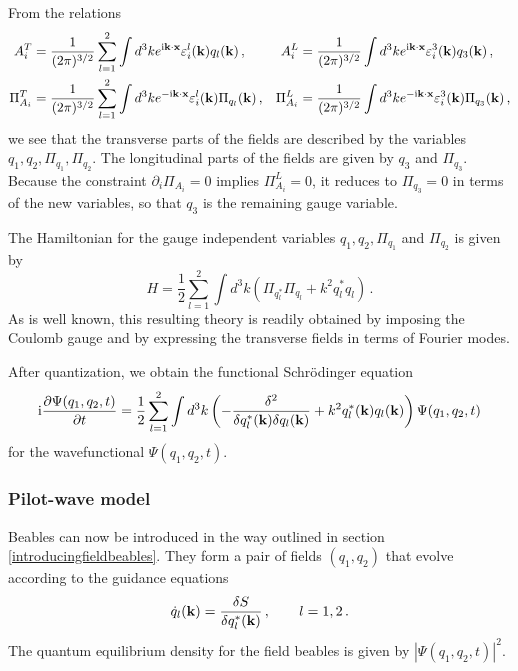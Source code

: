 \documentclass[12pt]{article}
\def\ii{\textrm i}
\begin{document}
From the relations
\begin{align}
A^T_i &= \frac{1}{(2\pi)^{3/2}} \sum^2_{l=1} \int d^3 k e^{\ii {\bf k} \cdot {\bf x}} \varepsilon^l_i({\bf k}) q_l({\bf k}) \,, & A^L_i &=  \frac{1}{(2\pi)^{3/2}} \int d^3 k e^{\ii {\bf k}  \cdot {\bf x}} \varepsilon^3_i({\bf k}) q_3({\bf k}) \,, \nonumber\\
\Pi^T_{A_i} &= \frac{1}{(2\pi)^{3/2}} \sum^2_{l=1} \int d^3 k e^{-\ii {\bf k} \cdot {\bf x}} \varepsilon^l_i({\bf k}) \Pi_{q_l}({\bf k}) \,, & \Pi^L_{A_i} &=  \frac{1}{(2\pi)^{3/2}} \int d^3 k e^{-\ii {\bf k}  \cdot {\bf x}}\varepsilon^3_i({\bf k}) \Pi_{q_3}({\bf k}) \,,
\label{e.12}
\end{align}
we see that the transverse parts of the fields are described by the variables $q_1,q_2,\Pi_{q_1},\Pi_{q_2}$. The longitudinal parts of the fields are given by $q_3$ and $\Pi_{q_3}$. Because the constraint $ \partial_i \Pi_{A_i}=0$ implies $\Pi^L_{A_i}=0$, it reduces to $\Pi_{q_3} =0$ in terms of the new variables, so that $q_3$ is the remaining gauge variable. 

The Hamiltonian for the gauge independent variables $q_1,q_2,\Pi_{q_1}$ and $\Pi_{q_2}$ is given by
\begin{equation}
H =  \frac{1}{2} \sum^2_{l=1} \int d^3 k \left(\Pi_{q^*_l}\Pi_{q_l} +  k^2 q^*_l q_l \right) \,.
\label{e.12.1}
\end{equation}
As is well known, this resulting theory is readily obtained by imposing the Coulomb gauge and by expressing the transverse fields in terms of Fourier modes. 

After quantization, we obtain the functional Schr{\"o}\-ding\-er equation
\begin{equation}
\ii\frac{\partial \Psi(q_1,q_2,t)}{\partial t} = \frac{1}{2} \sum^2_{l=1} \int d^3 k \left( -\frac{\delta^2}{ \delta q^*_l({\bf k}) \delta q_l({\bf k})} + k^2  q^*_l({\bf k}) q_l({\bf k}) \right)\Psi(q_1,q_2,t)
\label{e.15}
\end{equation}
for the wave\-func\-tion\-al $\Psi(q_1,q_2,t)$.


\subsubsection{Pilot-wave model}\label{bohmspilotwavemodel}
Beables can now be introduced in the way outlined in section \ref{introducingfieldbeables}. They form a pair of fields $(q_1,q_2)$ that evolve according to the guidance equations
\begin{equation}
{\dot q}_l({\bf k})   =  \frac{\delta S}{\delta  q^*_l({\bf k})  }\,, \qquad l=1,2 \,.
\label{e.16}
\end{equation}
The quantum equilibrium density for the field beables is given by $|\Psi(q_1,q_2,t)|^2$. 
\end{document}
